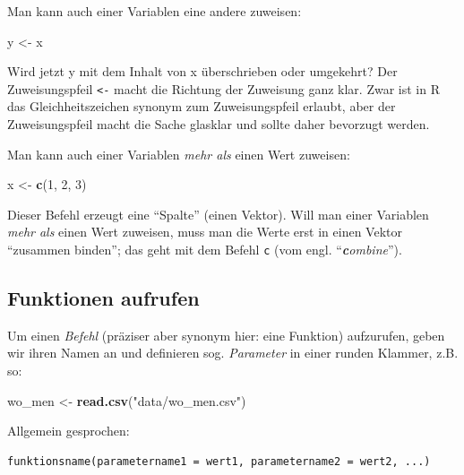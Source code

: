 \documentclass[12pt,ngerman,]{book}
\makeatletter
\newenvironment{Shaded}{\begin{snugshade}}{\end{snugshade}}
\newcommand{\KeywordTok}[1]{\textcolor[rgb]{0.13,0.29,0.53}{\textbf{#1}}}
\newcommand{\DecValTok}[1]{\textcolor[rgb]{0.00,0.00,0.81}{#1}}
\newcommand{\StringTok}[1]{\textcolor[rgb]{0.31,0.60,0.02}{#1}}
\newcommand{\NormalTok}[1]{#1}
\newenvironment{kframe}{%
\medskip{}
\setlength{\fboxsep}{.8em}
 \def\at@end@of@kframe{}%
 \ifinner\ifhmode%
  \def\at@end@of@kframe{\end{minipage}}%
  \begin{minipage}{\columnwidth}%
 \fi\fi%
 \def\FrameCommand##1{\hskip\@totalleftmargin \hskip-\fboxsep
 \colorbox{shadecolor}{##1}\hskip-\fboxsep
     \hskip-\linewidth \hskip-\@totalleftmargin \hskip\columnwidth}%
 \MakeFramed {\advance\hsize-\width
   \@totalleftmargin\z@ \linewidth\hsize
   \@setminipage}}%
 {\par\unskip\endMakeFramed%
 \at@end@of@kframe}
\renewenvironment{Shaded}{\begin{kframe}}{\end{kframe}}
\theoremstyle{definition}
\theoremstyle{definition}
\theoremstyle{remark}
\makeatother
\begin{document}
Man kann auch einer Variablen eine andere zuweisen:

\begin{Shaded}
\begin{Highlighting}[]
\NormalTok{y <-}\StringTok{ }\NormalTok{x}
\end{Highlighting}
\end{Shaded}

Wird jetzt y mit dem Inhalt von x überschrieben oder umgekehrt? Der
Zuweisungspfeil \texttt{\textless{}-} macht die Richtung der Zuweisung
ganz klar. Zwar ist in R das Gleichheitszeichen synonym zum
Zuweisungspfeil erlaubt, aber der Zuweisungspfeil macht die Sache
glasklar und sollte daher bevorzugt werden.

Man kann auch einer Variablen \emph{mehr als} einen Wert zuweisen:

\begin{Shaded}
\begin{Highlighting}[]
\NormalTok{x <-}\StringTok{ }\KeywordTok{c}\NormalTok{(}\DecValTok{1}\NormalTok{, }\DecValTok{2}\NormalTok{, }\DecValTok{3}\NormalTok{)}
\end{Highlighting}
\end{Shaded}

Dieser Befehl erzeugt eine ``Spalte'' (einen Vektor). Will man einer
Variablen \emph{mehr als} einen Wert zuweisen, muss man die Werte erst
in einen Vektor ``zusammen binden''; das geht mit dem Befehl \texttt{c}
(vom engl. ``\emph{\textbf{c}ombine}'').

\subsection{Funktionen aufrufen}\label{funktionen-aufrufen}

Um einen \emph{Befehl} (präziser aber synonym
hier: eine Funktion) aufzurufen, geben wir ihren Namen an und definieren
sog. \emph{Parameter} in einer runden
Klammer, z.B. so:

\begin{Shaded}
\begin{Highlighting}[]
\NormalTok{wo_men <-}\StringTok{ }\KeywordTok{read.csv}\NormalTok{(}\StringTok{"data/wo_men.csv"}\NormalTok{)}
\end{Highlighting}
\end{Shaded}

Allgemein gesprochen:

\begin{verbatim}
funktionsname(parametername1 = wert1, parametername2 = wert2, ...)
\end{verbatim}
\end{document}
